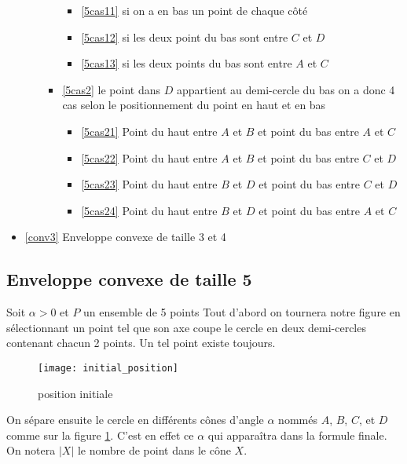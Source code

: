 \begin{itemize}
\begin{itemize}
\begin{itemize}
			\begin{itemize}
				\item \ref{5cas11} si on a en bas un point de chaque côté
				\item \ref{5cas12} si les deux point du bas sont entre $C$ et $D$
				\item \ref{5cas13} si les deux points du bas sont entre $A$ et $C$
			\end{itemize}
			\item \ref{5cas2} le point dans $D$ appartient au demi-cercle du bas
			on a donc 4 cas selon le positionnement du point en haut et en bas
			\begin{itemize}
				\item \ref{5cas21} Point du haut entre $A$ et $B$ et point du bas entre $A$ et $C$
				\item \ref{5cas22} Point du haut entre $A$ et $B$ et point du bas entre $C$ et $D$
				\item \ref{5cas23} Point du haut entre $B$ et $D$ et point du bas entre $C$ et $D$
				\item \ref{5cas24} Point du haut entre $B$ et $D$ et point du bas entre $A$ et $C$
			\end{itemize}
		\end{itemize}
	\end{itemize}
	\item \ref{conv3} Enveloppe convexe de taille 3 et 4
\end{itemize}

\subsection{Enveloppe convexe de taille 5}\label{conv5}

Soit $\alpha > 0$ et $P$ un ensemble de 5 points Tout d'abord on tournera notre figure en sélectionnant un point tel que son axe coupe le cercle en deux demi-cercles contenant chacun 2 points. Un tel point existe toujours.

\begin{figure}[h!]
  \centering
  \texttt{[image: initial\_position]}
  \caption{position initiale}
  \label{fig:initial_position}
\end{figure}

On sépare ensuite le cercle en différents cônes d'angle $\alpha$ nommés $A$,
$B$, $C$, et $D$ comme sur la figure \ref{fig:initial_position}. C'est en effet ce $\alpha$ qui apparaîtra dans la formule finale. On notera $|X|$ le nombre de point dans le cône $X$.

